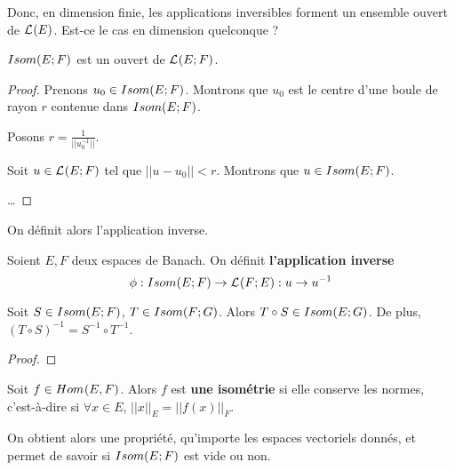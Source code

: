 Donc, en dimension finie, les applications inversibles forment un ensemble
ouvert de $\mathcal{L}_{}(E)$. Est-ce le cas en dimension quelconque ?

\begin{proposition}
	$Isom(E; F)$ est un ouvert de $\mathcal{L}_{}(E; F)$.
\end{proposition}

\ifdefined\outputproof
\begin{proof}
	Prenons $u_{0} \in Isom(E; F)$. Montrons que $u_{0}$ est le centre d'une
	boule de rayon $r$ contenue dans $Isom(E; F)$.

	Posons $r = \frac{1}{||u_{0}^{-1}||}$.

	Soit $u \in \mathcal{L}_{}(E; F)$ tel que $||u - u_{0}|| < r$. Montrons
	que $u \in Isom(E; F)$.

	\ldots
\end{proof}
\fi

On définit alors l'application inverse.

\begin{definition}
	Soient $E, F$ deux espaces de Banach. On définit \textbf{l'application
	inverse}
	\begin{equation*}
		\phi : Isom(E; F) \rightarrow \mathcal{L}_{}(F; E) : u \rightarrow u^{-1}
	\end{equation*}
\end{definition}

\begin{proposition}
	Soit $S \in Isom(E; F)$, $T \in Isom(F; G)$.
	Alors $T \circ S \in Isom(E; G)$. De plus, $(T \circ S)^{-1} = S^{-1} \circ
	T^{-1}$.
\end{proposition}

\ifdefined\outputproof
\begin{proof}

\end{proof}
\fi

\begin{definition}
\label{definition:isometrie}
	Soit $f \in Hom_{}(E, F)$.
	Alors $f$ est \textbf{une isométrie} si elle conserve les normes, c'est-à-dire si
	$\forall x \in E$, $||x||_{E} =  ||f(x)||_{F}$.
\end{definition}

On obtient alors une propriété, qu'importe les espaces vectoriels donnés, et
permet de savoir si $Isom(E; F)$ est vide ou non.


